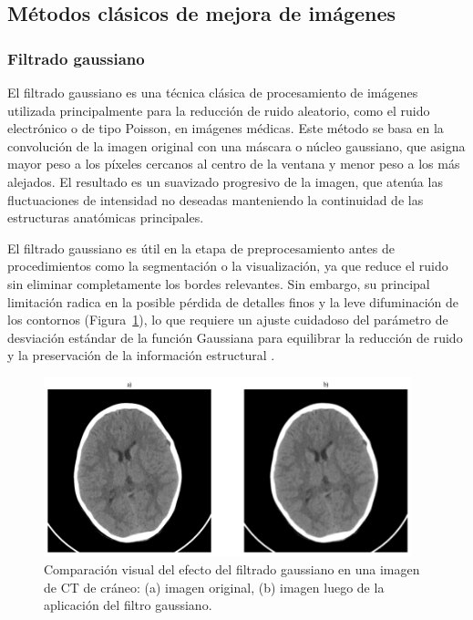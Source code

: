\subsection{Métodos clásicos de mejora de imágenes}

\subsubsection{Filtrado gaussiano}

El filtrado gaussiano \cite{GaussianFilter} es una técnica clásica de procesamiento de imágenes utilizada principalmente para la reducción de ruido aleatorio, como el ruido electrónico o de tipo Poisson, en imágenes médicas. Este método se basa en la convolución de la imagen original con una máscara o núcleo gaussiano, que asigna mayor peso a los píxeles cercanos al centro de la ventana y menor peso a los más alejados. El resultado es un suavizado progresivo de la imagen, que atenúa las fluctuaciones de intensidad no deseadas manteniendo la continuidad de las estructuras anatómicas principales.

El filtrado gaussiano es útil en la etapa de preprocesamiento antes de procedimientos como la segmentación o la visualización, ya que reduce el ruido sin eliminar completamente los bordes relevantes. Sin embargo, su principal limitación radica en la posible pérdida de detalles finos y la leve difuminación de los contornos (Figura~\ref{fig:filter-gaussian}), lo que requiere un ajuste cuidadoso del parámetro de desviación estándar de la función Gaussiana para equilibrar la reducción de ruido y la preservación de la información estructural \cite{ImageProcessingBook}.

\begin{figure}[H]
    \centering
    \includegraphics[width=0.95\textwidth]{Graphics/gaussian-filter.png}
    \caption{Comparación visual del efecto del filtrado gaussiano en una imagen de CT de cráneo: (a) imagen original, (b) imagen luego de la aplicación del filtro gaussiano.}
    \label{fig:filter-gaussian}
\end{figure}

